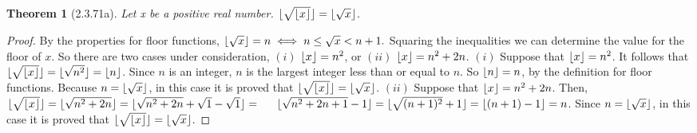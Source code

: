 \documentclass[a4paper, 12pt]{article}
\theoremstyle{plain}
\newtheorem*{theorem*}{Theorem}
\DeclarePairedDelimiter{\floor}{\lfloor}{\rfloor}
\begin{document}
	
	\begin{theorem*}[2.3.71a]
		Let x be a positive real number. $\floor{\sqrt{\floor{x}}} = \floor{\sqrt{x}}$.
	\end{theorem*}
	
	\begin{proof}
		By the properties for floor functions, \newline 
		$\floor{\sqrt{x}} = n \iff n \le \sqrt{x} < n + 1.$ Squaring the inequalities we can 
		determine the value for the floor of $x$. So there are two cases under consideration, 
		\newline $(i)$ $\floor{x} = n^2$, or $(ii)$ $\floor{x} = n^{2} + 2n$.
		\newline
		\newline \indent
		$(i)$ Suppose that $\floor{x} = n^{2}$. It follows that 
		$\floor{\sqrt{\floor{x}}} = \floor{\sqrt{n^2}} = \floor{n}$. \indent Since $n$ is an 
		integer, $n$ is the largest integer less than or equal to $n$. So \indent 
		$\floor{n} = n$, by the definition for floor functions. Because $n = \floor{\sqrt{x}}$, 
		in this \indent case it is proved that $\floor{\sqrt{\floor{x}}} = \floor{\sqrt{x}}$.
		\newline
		\newline \indent
		$(ii)$ Suppose that $\floor{x} = n^{2} + 2n$. Then, \newline \indent 
		$\floor{\sqrt{\floor{x}}} = \floor{\sqrt{n^{2} + 2n}} = 
		\floor{\sqrt{n^2 + 2n} + \sqrt{1} - \sqrt{1}} = \newline \indent 
		\floor{\sqrt{n^2 + 2n + 1} - 1} = \floor{\sqrt{(n+1)^2} + 1} = \floor{(n+1) -1} = n$. 
		Since \indent $n = \floor{\sqrt{x}}$, in this case it is proved that 
		$\floor{\sqrt{\floor{x}}} = \floor{\sqrt{x}}$.
	\end{proof}
\end{document}
